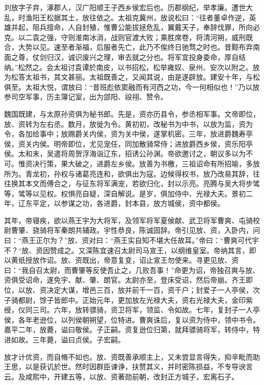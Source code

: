 \documentclass[12pt,UTF8]{ctexbook}
\begin{document}
刘放字子弃，涿郡人，汉广阳顺王子西乡侯宏后也。历郡纲纪，举孝廉。遭世大乱，时渔阳王松据其土，放往依之。太祖克冀州，放说松曰：“往者董卓作逆，英雄并起，阻兵擅命，人自封殖，惟曹公能拔拯危乱，翼戴天子，奉辞伐罪，所向必克。以二袁之强，守则淮南冰消，战则官渡大败；乘胜席卷，将清河朔，威刑既合，大势以见。速至者渐福，后服者先亡，此乃不俟终日驰骛之时也。昔黥布弃南面之尊，仗剑归汉，诚识废兴之理，审去就之分也。将军宜投身委命，厚自结纳。”松然之。会太祖讨袁谭於南皮，以书招松，松举雍奴、泉州、安次以附之。放为松答太祖书，其文甚丽。太祖既善之，又闻其说，由是遂辟放。建安十年，与松俱至。太祖大悦，谓放曰：“昔班彪依窦融而有河西之功，今一何相似也！”乃以放参司空军事，历主簿记室，出为郃阳、祋祤、赞令。

魏国既建，与太原孙资俱为秘书郎。先是，资亦历县令，参丞相军事。文帝即位，放、资转为左右丞。数月，放徙为令。黄初初，改秘书为中书，以放为监，资为令，各加给事中；放赐爵关内侯，资为关中侯，遂掌机密。三年，放进爵魏寿亭侯，资关内侯。明帝即位，尤见宠任，同加散骑常侍；进放爵西乡侯，资乐阳亭侯。太和末，吴遣将周贺浮海诣辽东，招诱公孙渊。帝欲邀讨之，朝议多以为不可。惟资决行策，果大破之，进爵左乡侯。放善为书檄，三祖诏命有所招喻，多放所为。青龙初，孙权与诸葛亮连和，欲俱出为寇。边候得权书，放乃改易其辞，往往换其本文而傅合之，与征东将军满宠，若欲归化，封以示亮。亮腾与吴大将步骘等，骘等以见权。权惧亮自疑，深自解说。是岁，俱加侍中、光禄大夫。景初二年，辽东平定，以参谋之功，各进爵，封本县，放方城侯，资中都侯。

其年，帝寝疾，欲以燕王宇为大将军，及领军将军夏侯献、武卫将军曹爽、屯骑校尉曹肇、骁骑将军秦朗共辅政。宇性恭良，陈诚固辞。帝引见放、资，入卧内，问曰：“燕王正尔为？”放、资对曰：“燕王实自知不堪大任故耳。”帝曰：“曹爽可代宇不？“放、资因赞成之。又深陈宜速召太尉司马宣王，以纲维皇室。帝纳其言，即以黄纸授放作诏。放、资既出，帝意复变，诏止宣王勿使来。寻更见放、资曰：“我自召太尉，而曹肇等反使吾止之，几败吾事！”命更为诏，帝独召爽与放、资俱受诏命，遂免宇、献、肇、朗官。太尉亦至，登床受诏，然后帝崩。齐王即位，以放、资决定大谋，增邑三百，放并前千一百，资千户；封爱子一人亭侯，次子骑都尉，馀子皆郎中。正始元年，更加放左光禄大夫，资右光禄大夫，金印紫绶，仪同三司。六年，放转骠骑，资卫将军，领监、令如故。七年，复封子一人亭侯，各年老逊位，以列侯朝朔望，位特进。曹爽诛后，复以资为侍中，领中书令。嘉平二年，放薨，谥曰敬侯。子正嗣。资复逊位归第，就拜骠骑将军，转侍中，特进如故。三年薨，谥曰贞侯。子宏嗣。

放才计优资，而自脩不如也。放、资既善承顺主上，又未尝显言得失，抑辛毗而助王思，以是获讥於世。然时因群臣谏诤，扶赞其义，并时密陈损益，不专导谀言云。及咸熙中，开建五等，以放、资著勋前朝，改封正方城子，宏离石子。
\end{document}
